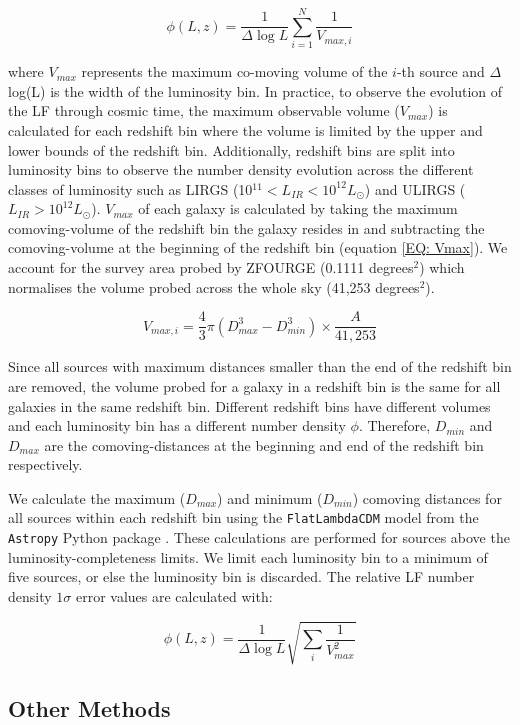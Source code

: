 \begin{equation} 
    \label{EQ: 1/Vmax}
    \phi(L,z) = \frac{1}{\Delta \log L}\sum_{i=1}^N \frac{1}{V_{max,i}}
\end{equation}

where $V_{max}$ represents the maximum co-moving volume of the $i$-th source and $\Delta$ log(L) is the width of the luminosity bin. In practice, to observe the evolution of the LF through cosmic time, the maximum observable volume ($V_{max}$) is calculated for each redshift bin where the volume is limited by the upper and lower bounds of the redshift bin. Additionally, redshift bins are split into luminosity bins to observe the number density evolution across the different classes of luminosity such as LIRGS (10$^{11} < L_{IR} < 10^{12} L_{\odot}$) and ULIRGS ($L_{IR} > 10^{12} L_{\odot}$). $V_{max}$ of each galaxy is calculated by taking the maximum comoving-volume of the redshift bin the galaxy resides in and subtracting the comoving-volume at the beginning of the redshift bin (equation \ref{EQ: Vmax}). We account for the survey area probed by ZFOURGE (0.1111 degrees$^2$) which normalises the volume probed across the whole sky (41,253 degrees$^2$). 

\begin{equation}
    \label{EQ: Vmax}
    V_{max,i} = \frac{4}{3} \pi \left(D_{max}^3 - D_{min}^3\right) \times \frac{A}{41,253}
\end{equation}

Since all sources with maximum distances smaller than the end of the redshift bin are removed, the volume probed for a galaxy in a redshift bin is the same for all galaxies in the same redshift bin. Different redshift bins have different volumes and each luminosity bin has a different number density $\phi$. Therefore, $D_{min}$ and $D_{max}$ are the comoving-distances at the beginning and end of the redshift bin respectively. 

We calculate the maximum ($D_{max}$) and minimum ($D_{min}$) comoving distances for all sources within each redshift bin using the \texttt{FlatLambdaCDM} model from the \texttt{Astropy} Python package \citep{astropy_collaboration_astropy_2022}. These calculations are performed for sources above the luminosity-completeness limits. We limit each luminosity bin to a minimum of five sources, or else the luminosity bin is discarded. The relative LF number density $1\sigma$ error values are calculated with:

\begin{equation} 
    \label{EQ: Vmax Error}
    \phi(L,z) = \frac{1}{\Delta \log L}\sqrt{\sum_i \frac{1}{V_{max}^2}}
\end{equation}

\subsection{Other Methods}